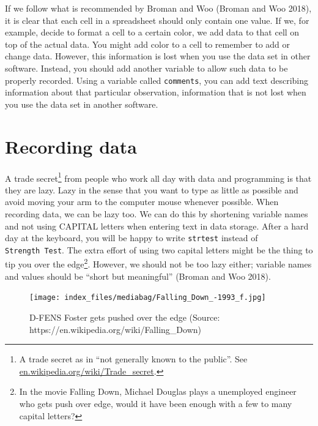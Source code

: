 \documentclass[
  11pt,
  letterpaper,
]{scrbook}
\begin{document}
If we follow what is recommended by Broman and Woo (Broman and Woo
2018), it is clear that each cell in a spreadsheet should only contain
one value. If we, for example, decide to format a cell to a certain
color, we add data to that cell on top of the actual data. You might add
color to a cell to remember to add or change data. However, this
information is lost when you use the data set in other software.
Instead, you should add another variable to allow such data to be
properly recorded. Using a variable called \texttt{comments}, you can
add text describing information about that particular observation,
information that is not lost when you use the data set in another
software.

\hypertarget{recording-data}{%
\section{Recording data}\label{recording-data}}

A trade secret\footnote{A trade secret as in ``not generally known to
  the public''. See
  \href{https://en.wikipedia.org/wiki/Trade_secret}{en.wikipedia.org/wiki/Trade\_secret}.}
from people who work all day with data and programming is that they are
lazy. Lazy in the sense that you want to type as little as possible and
avoid moving your arm to the computer mouse whenever possible. When
recording data, we can be lazy too. We can do this by shortening
variable names and not using CAPITAL letters when entering text in data
storage. After a hard day at the keyboard, you will be happy to write
\texttt{strtest} instead of \texttt{Strength\ Test}. The extra effort of
using two capital letters might be the thing to tip you over the
edge\footnote{In the movie Falling Down, Michael Douglas plays a
  unemployed engineer who gets push over edge, would it have been enough
  with a few to many capital letters?}. However, we should not be too
lazy either; variable names and values should be ``short but
meaningful'' (Broman and Woo 2018).

\begin{figure}

{\centering \texttt{[image: index\_files/mediabag/Falling\_Down\_-1993\_f.jpg]}

}

\caption[Michael Douglas in Falling Down]{D-FENS Foster gets pushed over
the edge (Source: https://en.wikipedia.org/wiki/Falling\_Down)}

\end{figure}
\end{document}
